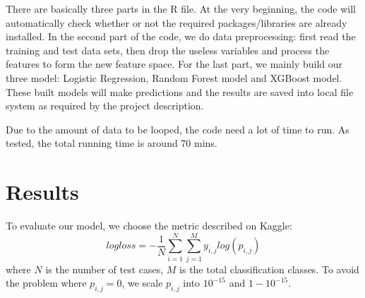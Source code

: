 \documentclass[12pt]{article}
\begin{document}
There are basically three parts in the R file. At the very beginning, the code will automatically check whether or not the required packages/libraries are already installed. In the second part of the code, we do data preprocessing: first read the training and test data sets, then drop the useless variables and process the features to form the new feature space. For the last part, we mainly build our three model: Logistic Regression, Random Forest model and XGBoost model. These built models will make predictions and the results are saved into local file system as required by the project description.

Due to the amount of data to be looped, the code need a lot of time to run. As tested, the total running time is around 70 mins.

\section{Results}

\quad To evaluate our model, we choose the metric described on Kaggle:
\begin{equation}
logloss = - \frac{1}{N} \sum_{i=1}^N \sum_{j=1}^M y_{i, j} log(p_{i, j})
\end{equation}
where $N$ is the number of test cases, $M$ is the total classification classes. To avoid the problem where $p_{i, j} = 0$, we scale $p_{i, j}$ into $10 ^ {-15}$ and $1 - 10 ^ {-15}$.
\end{document}
